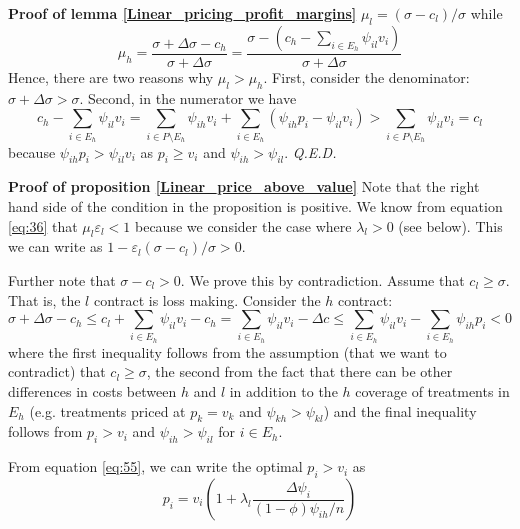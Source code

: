 \documentclass[a4paper,12pt]{article}
\newcommand{\qed}{\hspace*{\fill} {\em Q.E.D.}}
\begin{document}
\textbf{Proof of lemma \ref{Linear_pricing_profit_margins}}
\(\mu_l = (\sigma-c_l)/\sigma\) while
\begin{equation}
\label{eq:59}
\mu_h = \frac{\sigma+\Delta\sigma - c_h}{\sigma+\Delta\sigma}=\frac{\sigma-(c_h-\sum_{i \in E_h} \psi_{il} v_i)}{\sigma+\Delta\sigma}
\end{equation}
Hence, there are two reasons why \(\mu_l > \mu_h\). First, consider the denominator: \(\sigma+\Delta\sigma>\sigma\). Second, in the numerator we have
\begin{equation}
\label{eq:67}
c_h-\sum_{i \in E_h} \psi_{il} v_i = \sum_{i \in P \setminus E_h} \psi_{ih}v_i + \sum_{i \in E_h} (\psi_{ih}p_i-\psi_{il}v_i) > \sum_{i \in P \setminus E_h} \psi_{il} v_i = c_l
\end{equation}
because \(\psi_{ih}p_i > \psi_{il}v_i\) as \(p_i \geq v_i\) and \(\psi_{ih}>\psi_{il}\). 
 \qed

\textbf{Proof of proposition \ref{Linear_price_above_value}}
Note that the right hand side of the condition in the proposition is positive. We know from equation \eqref{eq:36} that \(\mu_l \varepsilon_l<1\) because we consider the case where \(\lambda_l > 0\) (see below). This we can write as \(1-\varepsilon_l (\sigma-c_l)/\sigma >0\).

Further note that \(\sigma-c_l >0\). We prove this by contradiction. Assume that \(c_l \geq \sigma\). That is, the \(l\) contract is loss making. Consider the \(h\) contract:
\begin{equation}
\label{eq:46}
\sigma+\Delta \sigma - c_h \leq c_l + \sum_{i \in E_h} \psi_{il} v_i - c_h =  \sum_{i \in E_h} \psi_{il} v_i - \Delta c \leq \sum_{i \in E_h} \psi_{il} v_i - \sum_{i \in E_h} \psi_{ih} p_i < 0
\end{equation}
where the first inequality follows from the assumption (that we want to contradict) that \(c_l \geq \sigma\), the second from the fact that there can be other differences in costs between \(h\) and \(l\) in addition to the \(h\) coverage of treatments in \(E_h\) (e.g. treatments priced at \(p_k=v_k\) and \(\psi_{kh}>\psi_{kl}\)) and the final inequality follows from \(p_i>v_i\) and \(\psi_{ih} > \psi_{il}\) for \(i \in E_h\).

From equation \eqref{eq:55}, we can write the optimal \(p_i>v_i\) as
\begin{equation}
\label{eq:60}
p_i = v_i \left( 1+ \lambda_l \frac{\Delta\psi_i}{(1-\phi)\psi_{ih}/n} \right)
\end{equation}
\end{document}
